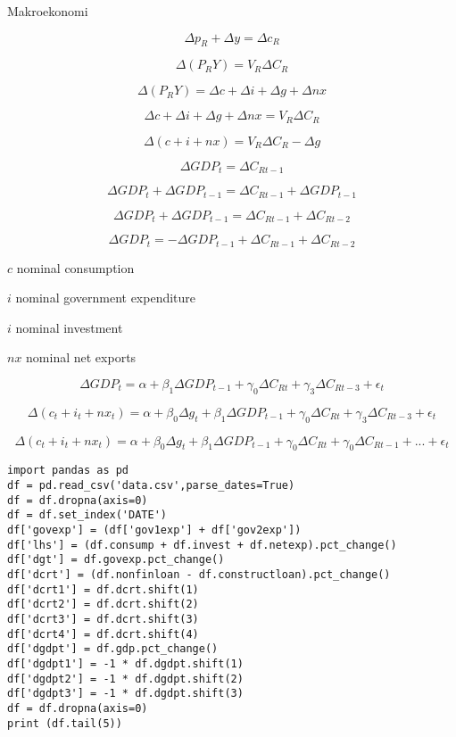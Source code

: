 \documentclass[12pt,fleqn]{article}\usepackage{../../common}
\begin{document}
Makroekonomi

$$ \Delta p_R + \Delta y = \Delta c_R$$

$$ \Delta (P_RY) = V_R\Delta C_R$$

$$ \Delta (P_RY) = \Delta c + \Delta i + \Delta g + \Delta nx $$

$$ \Delta c + \Delta i + \Delta g + \Delta nx = V_R\Delta C_R$$

$$ \Delta (c +  i +  nx) = V_R\Delta C_R - \Delta g$$

$$ \Delta GDP_t = \Delta C_{Rt-1}$$

$$ \Delta GDP_t + \Delta GDP_{t-1} = \Delta C_{Rt-1} + \Delta GDP_{t-1} $$

$$ \Delta GDP_t + \Delta GDP_{t-1} = \Delta C_{Rt-1} + \Delta C_{Rt-2}  $$

$$ \Delta GDP_t = - \Delta GDP_{t-1} + \Delta C_{Rt-1} + \Delta C_{Rt-2}  $$


$c$ nominal consumption 

$i$ nominal government expenditure

$i$ nominal investment 

$nx$ nominal net exports

$$ \Delta GDP_t = 
\alpha + \beta_1 \Delta GDP_{t-1} + 
\gamma_0 \Delta C_{Rt} + \gamma_3 \Delta C_{Rt-3} + \epsilon_t 
$$

$$ 
\Delta (c_t + i_t + nx_t) = 
\alpha + \beta_0 \Delta g_t + \beta_1 \Delta GDP_{t-1} + 
\gamma_0 \Delta C_{Rt} + \gamma_3 \Delta C_{Rt-3} + \epsilon_t 
$$

$$ 
\Delta (c_t + i_t + nx_t) =  
\alpha + \beta_0 \Delta g_t + 
\beta_1 \Delta GDP_{t-1} +  
\gamma_0 \Delta C_{Rt} + 
 \gamma_0 \Delta C_{Rt-1} + ...  + \epsilon_t 
$$


\begin{verbatim}
import pandas as pd
df = pd.read_csv('data.csv',parse_dates=True)
df = df.dropna(axis=0)
df = df.set_index('DATE')
df['govexp'] = (df['gov1exp'] + df['gov2exp']) 
df['lhs'] = (df.consump + df.invest + df.netexp).pct_change()
df['dgt'] = df.govexp.pct_change()
df['dcrt'] = (df.nonfinloan - df.constructloan).pct_change()
df['dcrt1'] = df.dcrt.shift(1)
df['dcrt2'] = df.dcrt.shift(2)
df['dcrt3'] = df.dcrt.shift(3)
df['dcrt4'] = df.dcrt.shift(4)
df['dgdpt'] = df.gdp.pct_change()
df['dgdpt1'] = -1 * df.dgdpt.shift(1)
df['dgdpt2'] = -1 * df.dgdpt.shift(2)
df['dgdpt3'] = -1 * df.dgdpt.shift(3)
df = df.dropna(axis=0)
print (df.tail(5))
\end{verbatim}
\end{document}
